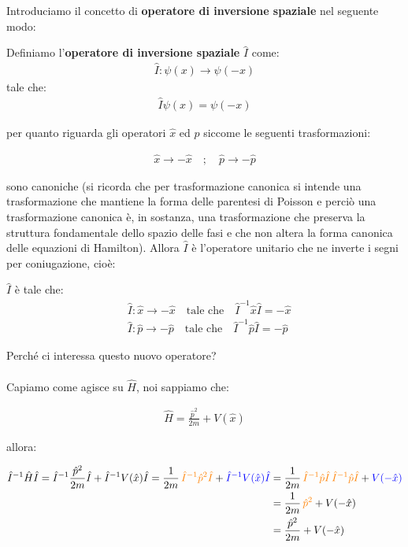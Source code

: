 	Introduciamo il concetto di \textbf{operatore di inversione spaziale} nel seguente modo:
	
\begin{mydef}
	Definiamo l'\textbf{operatore di inversione spaziale} $\hat{I}$ come:
\begin{align*}
	\hat{I} : \psi(x) \to \psi(-x)
\end{align*}
	tale che:
\begin{align*}
	\hat{I}\psi(x) = \psi(-x)
\end{align*}
\end{mydef}

	per quanto riguarda gli operatori $\hat{x}$ ed $\hat{p}$ siccome le seguenti trasformazioni:
	
\begin{align*}
	\hat{x} \to -\hat{x} \quad ; \quad \hat{p} \to -\hat{p}
\end{align*}

	sono canoniche (si ricorda che per trasformazione canonica si intende una trasformazione che mantiene la forma delle parentesi di Poisson e perciò una trasformazione canonica è, in sostanza, una trasformazione che preserva la struttura fondamentale dello spazio delle fasi e che non altera la forma canonica delle equazioni di Hamilton). Allora $\hat{I}$ è l'operatore unitario che ne inverte i segni per coniugazione, cioè:

\begin{nb}	
	$\hat{I}$ è tale che:
\begin{align*}
	& \hat{I} : \hat{x} \to - \hat{x} \quad \text{tale che} \quad \hat{I}^{-1}\hat{x}\hat{I} = - \hat{x} \\
	& \hat{I} : \hat{p} \to - \hat{p} \quad \text{tale che} \quad \hat{I}^{-1}\hat{p}\hat{I} = - \hat{p} 
\end{align*} 
\end{nb}

	Perché ci interessa questo nuovo operatore? 
	\\
	\\
	Capiamo come agisce su $\hat{H}$, noi sappiamo che:
	
\begin{align*}
	\hat{H} = \frac{\hat{p}^2}{2m} + V(\hat{x})
\end{align*}

	allora:
	
\begin{align*}
	\hat{I}^{-1}\hat{H}\hat{I} = \hat{I}^{-1}\frac{\hat{p}^2}{2m}\hat{I} + \hat{I}^{-1}V(\hat{x})\hat{I} = \frac{1}{2m} \, \textcolor{orange}{\hat{I}^{-1}\hat{p}^2\hat{I}} + \textcolor{blue}{\hat{I}^{-1}V(\hat{x})\hat{I}} &= \frac{1}{2m} \, \textcolor{orange}{\hat{I}^{-1}\hat{p}\hat{I} \, \hat{I}^{-1}\hat{p}\hat{I}} + \textcolor{blue}{V(-\hat{x})} \\
	& =  \frac{1}{2m} \, \textcolor{orange}{\hat{p}^2} +V(-\hat{x}) \\
	& =  \frac{\hat{p}^2}{2m} +V(-\hat{x}) 
\end{align*}
	
